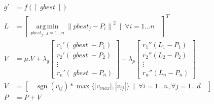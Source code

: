 \documentclass[10pt]{article}
\DeclareMathOperator*{\argmin}{arg\,min}
\DeclareMathOperator*{\sgn}{sgn}
\DeclareMathOperator*{\gbest}{\mathit{gbest}}
\begin{document}
\begin{align*}
  g' &= f([\gbest])\\
  L  &= {[\argmin\limits_{pbest_j,\ j = 1\dots n} {\|pbest_j - P_i\|}^2\ \mid\ \forall i = 1\dots n\quad ]}^T\\
  V  &= \mu.V + \lambda_g\begin{bmatrix}
    {r_1}'(\gbest - P_1)\\
    {r_2}'(\gbest - P_2)\\
    \vdots\\
    {r_n}'(\gbest - P_n)
  \end{bmatrix} + \lambda_p\begin{bmatrix}
    {r_1}''(L_1 - P_1)\\
    {r_2}''(L_2 - P_2)\\
    \vdots\\
    {r_n}''(L_n - P_n)
  \end{bmatrix}\\
  V  &= [\quad\sgn(v_{ij})*\max\{|v_{max}|,|v_{ij}|\}\ \mid\ \forall i=1\dots n,\forall j=1\dots d\quad]\\
  P  &= P + V\\
\end{align*}
\end{document}
